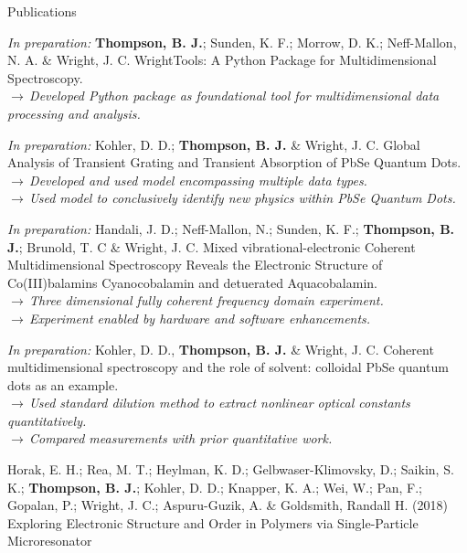 \documentclass{resume}  %
\begin{document}
\begin{rSection}{Publications}
  \begin{etaremune}[leftmargin = 1.75em]
    \item \textit{In preparation:}
      \textbf{Thompson, B. J.}; Sunden, K. F.; Morrow, D. K.; Neff-Mallon, N. A.
      \& Wright, J. C.
      WrightTools: A Python Package for Multidimensional Spectroscopy. \\
      $\rightarrow\,$\textit{Developed Python package as foundational tool for multidimensional
        data processing and analysis.}
    \item \textit{In preparation:}
      Kohler, D. D.; \textbf{Thompson, B. J.} \& Wright, J. C.
      Global Analysis of Transient Grating and Transient Absorption of PbSe Quantum Dots. \\
      $\rightarrow\,$\textit{Developed and used model encompassing multiple data types.} \\
      $\rightarrow\,$\textit{Used model to conclusively identify new physics within PbSe Quantum
        Dots.}
    \item \textit{In preparation:}
      Handali, J. D.; Neff-Mallon, N.; Sunden, K. F.; \textbf{Thompson, B. J.}; Brunold, T. C
      \& Wright, J. C.
      Mixed vibrational-electronic Coherent Multidimensional Spectroscopy Reveals the Electronic
      Structure of Co(III)balamins Cyanocobalamin and detuerated Aquacobalamin. \\
      $\rightarrow\,$\textit{Three dimensional fully coherent frequency domain experiment.} \\
      $\rightarrow\,$\textit{Experiment enabled by hardware and software enhancements.}
    \item \textit{In preparation:}
      Kohler, D. D., \textbf{Thompson, B. J.} \& Wright, J. C.
      Coherent multidimensional spectroscopy and the role of solvent: colloidal PbSe quantum dots
      as an example. \\
      $\rightarrow\,$\textit{Used standard dilution method to extract nonlinear optical constants
        quantitatively.} \\
      $\rightarrow\,$\textit{Compared measurements with prior quantitative work.}
    \item Horak, E. H.; Rea, M. T.; Heylman, K. D.; Gelbwaser-Klimovsky, D.; Saikin, S. K.;
      \textbf{Thompson, B. J.}; Kohler, D. D.; Knapper, K. A.; Wei, W.; Pan, F.; Gopalan, P.;
      Wright, J. C.; Aspuru-Guzik, A. \& Goldsmith, Randall H.
      (2018)
      Exploring Electronic Structure and Order in Polymers via Single-Particle Microresonator

\end{etaremune}
\end{rSection}
\end{document}
